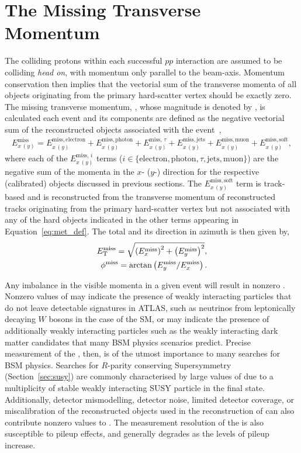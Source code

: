 \section{The Missing Transverse Momentum}
\label{sec:met}

The colliding protons within each successful $pp$ interaction are assumed to be colliding
\textit{head on}, with momentum only parallel to the beam-axis.
Momentum conservation then implies that the vectorial sum of the transverse momenta of all objects
originating from the primary hard-scatter vertex should be exactly zero.
The missing transverse momentum, \ptmiss, whose magnitude is denoted by \met, is calculated
each event and its components are defined as the negative vectorial sum of the
reconstructed objects associated with the event~\cite{METPaper},
\begin{align}
    E_{x\,(y)}^{\text{miss}} = E_{x\,(y)}^{\text{miss},\,\text{electron}} + E_{x\,(y)}^{\text{miss},\,\text{photon}} + E_{x\,(y)}^{\text{miss},\,\tau} + E_{x\,(y)}^{\text{miss},\,\text{jets}} + E_{x\,(y)}^{\text{miss},\,\text{muon}} + E_{x\,(y)}^{\text{miss},\,\text{soft}},
    \label{eq:met_def}
\end{align}
where each of the $E_{x\,(y)}^{\text{miss},\,i}$ terms ($i \in \{ \text{electron}, \text{photon}, \tau, \text{jets}, \text{muon} \}$)
are the negative sum of the momenta in the $x$- ($y$-) direction for the respective (calibrated) objects discussed in previous sections.
The $E_{x\,(y)}^{\text{miss},\,\text{soft}}$ term is track-based and is reconstructed from the transverse momentum of 
reconstructed tracks originating from the primary hard-scatter vertex but not associated with any of the
hard objects indicated in the other terms appearing in Equation~\ref{eq:met_def}.
The total \met and its direction in azimuth is then given by,
\begin{align}
    E_{\text{T}}^{\text{miss}} = \sqrt{ \left(E_x^{\text{miss}} \right)^2 + \left( E_y^{\text{miss}} \right)^2 }, \\
    \phi^{\text{miss}} = \arctan \left( E_y^{\text{miss}} / E_x^{\text{miss}} \right).
\end{align}

Any imbalance in the visible momenta in a given event will result in nonzero \met.
Nonzero values of \met may indicate the presence of weakly interacting particles that do not leave
detectable signatures in ATLAS, such as neutrinos from leptonically decaying $W$ bosons
in the case of the SM, or may indicate the presence of additionally weakly interacting particles
such as the weakly interacting dark matter candidates that many BSM physics scenarios predict.
Precise measurement of the \met, then, is of the utmost importance to many searches for BSM physics.
Searches for $R$-parity conserving Supersymmetry (Section~\ref{sec:susy}) are commonly characterised
by large values of \met due to a multiplicity of stable weakly interacting SUSY particle in the final state.
Additionally, detector mismodelling, detector noise, limited detector coverage, or miscalibration of the reconstructed objects used in the reconstruction
of \ptmiss can also contribute nonzero values to \met.
The measurement resolution of the \met is also susceptible to pileup effects, and generally
degrades as the levels of pileup increase.
